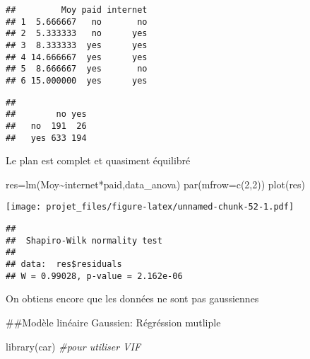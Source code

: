 \documentclass[
]{article}
\newenvironment{Shaded}{\begin{snugshade}}{\end{snugshade}}
\newcommand{\AttributeTok}[1]{\textcolor[rgb]{0.77,0.63,0.00}{#1}}
\newcommand{\CommentTok}[1]{\textcolor[rgb]{0.56,0.35,0.01}{\textit{#1}}}
\newcommand{\DecValTok}[1]{\textcolor[rgb]{0.00,0.00,0.81}{#1}}
\newcommand{\FunctionTok}[1]{\textcolor[rgb]{0.00,0.00,0.00}{#1}}
\newcommand{\NormalTok}[1]{#1}
\newcommand{\OtherTok}[1]{\textcolor[rgb]{0.56,0.35,0.01}{#1}}
\newcommand{\SpecialCharTok}[1]{\textcolor[rgb]{0.00,0.00,0.00}{#1}}
\begin{document}
\begin{verbatim}
##         Moy paid internet
## 1  5.666667   no       no
## 2  5.333333   no      yes
## 3  8.333333  yes      yes
## 4 14.666667  yes      yes
## 5  8.666667  yes       no
## 6 15.000000  yes      yes
\end{verbatim}

\begin{Shaded}
\end{Shaded}

\begin{verbatim}
##      
##        no yes
##   no  191  26
##   yes 633 194
\end{verbatim}

Le plan est complet et quasiment équilibré

\begin{Shaded}
\begin{Highlighting}[]
\NormalTok{res}\OtherTok{=}\FunctionTok{lm}\NormalTok{(Moy}\SpecialCharTok{\textasciitilde{}}\NormalTok{internet}\SpecialCharTok{*}\NormalTok{paid,data\_anova)}
\FunctionTok{par}\NormalTok{(}\AttributeTok{mfrow=}\FunctionTok{c}\NormalTok{(}\DecValTok{2}\NormalTok{,}\DecValTok{2}\NormalTok{))}
\FunctionTok{plot}\NormalTok{(res)}
\end{Highlighting}
\end{Shaded}

\texttt{[image: projet\_files/figure-latex/unnamed-chunk-52-1.pdf]}

\begin{Shaded}
\end{Shaded}

\begin{verbatim}
## 
##  Shapiro-Wilk normality test
## 
## data:  res$residuals
## W = 0.99028, p-value = 2.162e-06
\end{verbatim}

On obtiens encore que les données ne sont pas gaussiennes

\#\#Modèle linéaire Gaussien: Régréssion mutliple

\begin{Shaded}
\begin{Highlighting}[]
\FunctionTok{library}\NormalTok{(car) }\CommentTok{\#pour utiliser VIF}
\end{Highlighting}
\end{Shaded}
\end{document}
